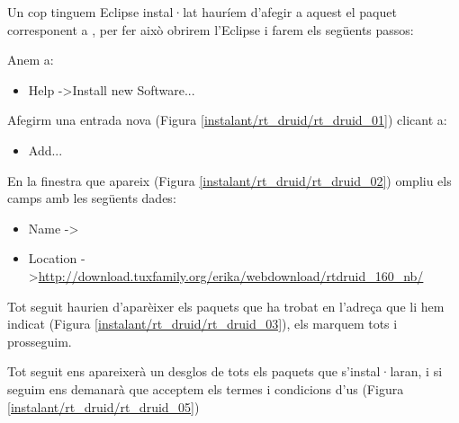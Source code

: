 Un cop tinguem Eclipse instal·lat hauríem d'afegir a aquest el paquet corresponent a \RTDruid, per fer això obrirem l'Eclipse i farem els següents passos:

Anem a:
\begin{itemize}
	\item Help -\textgreater Install new Software...
\end{itemize}



	
Afegirm una entrada nova (Figura \ref{instalant/rt_druid/rt_druid_01}) clicant a:
\begin{itemize}
	\item Add...
\end{itemize}



En la finestra que apareix (Figura \ref{instalant/rt_druid/rt_druid_02}) ompliu els camps amb les següents dades:
\begin{itemize}
	\item Name -\textgreater  \RTDruid
	\item Location -\textgreater  \url{http://download.tuxfamily.org/erika/webdownload/rtdruid_160_nb/}
\end{itemize}



Tot seguit haurien d'aparèixer els paquets que ha trobat en l'adreça que li hem indicat (Figura \ref{instalant/rt_druid/rt_druid_03}), els marquem tots i prosseguim.


	
	
Tot seguit ens apareixerà un desglos de tots els paquets que s'instal·laran, i si seguim ens demanarà que acceptem els termes i condicions d'us (Figura \ref{instalant/rt_druid/rt_druid_05})



